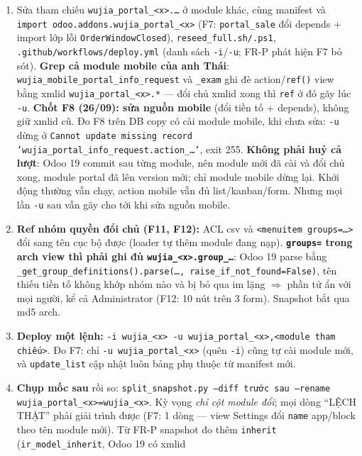 \begin{enumerate}
  mỗi \texttt{wujia\_<x>}) và thêm vào \texttt{DEPRECATED} của \texttt{check\_layers}. Bump version
  cả hai.
\item Sửa tham chiếu \texttt{wujia\_portal\_<x>.\ldots} ở module khác, cùng manifest và
  \texttt{import odoo.addons.wujia\_portal\_<x>} (F7: \texttt{portal\_sale} đổi depends +
  import lớp lỗi \texttt{OrderWindowClosed}), \texttt{reseed\_full.sh/.ps1},
  \texttt{.github/workflows/deploy.yml} (danh sách \texttt{-i}/\texttt{-u}; FR-P phát hiện F7 bỏ
  sót). \textbf{Grep cả module mobile của anh Thái}: \texttt{wujia\_mobile\_portal\_info\_request}
  và \texttt{\_exam} ghi đè action/\texttt{ref()} view bằng xmlid \texttt{wujia\_portal\_<x>.*} ---
  đổi chủ xmlid xong thì \texttt{ref} ở đó gãy lúc \texttt{-u}. \textbf{Chốt F8 (26/09): sửa nguồn
  mobile} (đổi tiền tố + depends), không giữ xmlid cũ. Đo F8 trên DB copy có cài module mobile, khi
  chưa sửa: \texttt{-u} dừng ở \texttt{Cannot update missing record
  'wujia\_portal\_info\_request.action\_\ldots'}, exit 255. \textbf{Không phải huỷ cả lượt}: Odoo 19
  commit sau từng module, nên module mới đã cài và đổi chủ xong, module portal đã lên version mới;
  chỉ module mobile dừng lại. Khởi động thường vẫn chạy, action mobile vẫn đủ list/kanban/form.
  Nhưng mọi lần \texttt{-u} sau vẫn gãy cho tới khi sửa nguồn mobile.
\item \textbf{Ref nhóm quyền đổi chủ (F11, F12):} ACL csv và \texttt{<menuitem groups=\ldots>} đổi sang tên
  cục bộ được (loader tự thêm module đang nạp). \textbf{\texttt{groups=} trong arch view thì phải ghi đủ
  \texttt{wujia\_<x>.group\_\ldots}}: Odoo 19 parse bằng \texttt{\_get\_group\_definitions().parse(\ldots,
  raise\_if\_not\_found=False)}, tên thiếu tiền tố không khớp nhóm nào và bị bỏ qua im lặng $\Rightarrow$ phần tử
  ẩn với mọi người, kể cả Administrator (F12: 10 nút trên 3 form). Snapshot bắt qua md5 arch.
\item \textbf{Deploy một lệnh:} \texttt{-i wujia\_<x> -u wujia\_portal\_<x>,<module tham chiếu>}.
  Đo F7: chỉ \texttt{-u wujia\_portal\_<x>} (quên \texttt{-i}) cũng tự cài module mới, và
  \texttt{update\_list} cập nhật luôn bảng phụ thuộc từ manifest mới.
\item \textbf{Chụp mốc sau} rồi so: \texttt{split\_snapshot.py --diff trước sau --rename
  wujia\_portal\_<x>=wujia\_<x>}. Kỳ vọng \emph{chỉ cột module đổi}; mọi dòng ``LỆCH THẬT''
  phải giải trình được (F7: 1 dòng --- view Settings đổi \texttt{name} app/block theo tên module
  mới). Từ FR-P snapshot đo thêm \texttt{inherit} (\texttt{ir\_model\_inherit}, Odoo 19 có xmlid

\end{enumerate}
